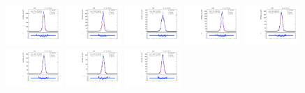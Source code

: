 \begin{figure}[htb]
\includegraphics[width=0.19\textwidth]{plots/Appendix_Recoil_Fits/ZmmData_PF_5TeV_2G_bkg/pfu1fit_8.pdf}
\includegraphics[width=0.19\textwidth]{plots/Appendix_Recoil_Fits/ZmmData_PF_5TeV_2G_bkg/pfu1fit_9.pdf}
\includegraphics[width=0.19\textwidth]{plots/Appendix_Recoil_Fits/ZmmData_PF_5TeV_2G_bkg/pfu1fit_19.pdf}
\includegraphics[width=0.19\textwidth]{plots/Appendix_Recoil_Fits/ZmmData_PF_5TeV_2G_bkg/pfu1fit_11.pdf}
\includegraphics[width=0.19\textwidth]{plots/Appendix_Recoil_Fits/ZmmData_PF_5TeV_2G_bkg/pfu1fit_12.pdf}
\includegraphics[width=0.19\textwidth]{plots/Appendix_Recoil_Fits/ZmmData_PF_5TeV_2G_bkg/pfu1fit_13.pdf}
\includegraphics[width=0.19\textwidth]{plots/Appendix_Recoil_Fits/ZmmData_PF_5TeV_2G_bkg/pfu1fit_14.pdf}
\includegraphics[width=0.19\textwidth]{plots/Appendix_Recoil_Fits/ZmmData_PF_5TeV_2G_bkg/pfu1fit_15.pdf}

\end{figure}
